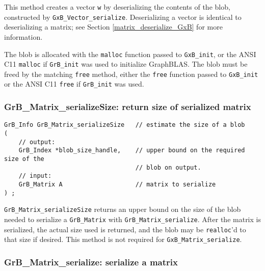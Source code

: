 \documentclass[12pt]{article}
\begin{document}
This method creates a vector \verb'w' by deserializing the contents of the
blob, constructed by
\verb'GxB_Vector_serialize'.
Deserializing a vector is identical to deserializing a matrix;
see Section \ref{matrix_deserialize_GxB} for more information.

The blob is allocated with the \verb'malloc' function passed to
\verb'GxB_init', or the ANSI C11 \verb'malloc' if \verb'GrB_init' was used
to initialize GraphBLAS.  The blob must be freed by the matching \verb'free'
method, either the \verb'free' function passed to \verb'GxB_init' or
the ANSI C11 \verb'free' if \verb'GrB_init' was used.

\subsubsection{{\sf GrB\_Matrix\_serializeSize:}  return size of serialized matrix}
\label{matrix_serialize_size}

\begin{mdframed}[userdefinedwidth=6in]
{\footnotesize
\begin{verbatim}
GrB_Info GrB_Matrix_serializeSize   // estimate the size of a blob
(
    // output:
    GrB_Index *blob_size_handle,    // upper bound on the required size of the
                                    // blob on output.
    // input:
    GrB_Matrix A                    // matrix to serialize
) ;
\end{verbatim}
} \end{mdframed}

\verb'GrB_Matrix_serializeSize' returns an upper bound on the size of the blob
needed to serialize a \verb'GrB_Matrix' with \verb'GrB_Matrix_serialize'.
After the matrix is serialized, the actual size used is returned, and the blob
may be \verb'realloc''d to that size if desired.
This method is not required for \verb'GxB_Matrix_serialize'.

\newpage
\subsubsection{{\sf GrB\_Matrix\_serialize:}      serialize a matrix}
\label{matrix_serialize}
\end{document}
